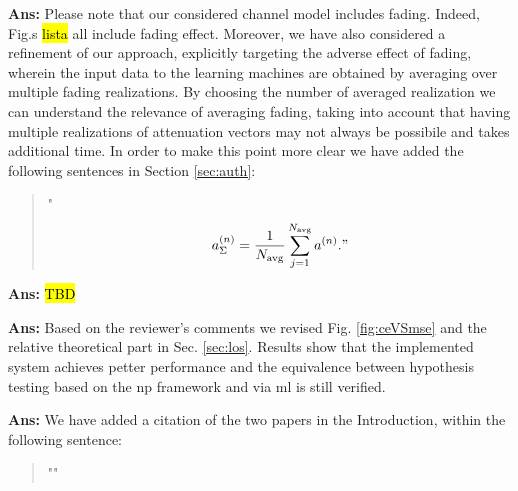 \documentclass[draftcls,onecolumn,12pt]{IEEEtran}
\newcounter{revc}
\newcommand{\revp}[1]{\zref[revcontent]{#1}}
\begin{document}
{\bf Ans:} Please note that our considered channel model includes fading. Indeed, Fig.s \hl{lista} all include fading effect. Moreover, we have also considered a refinement of our approach, explicitly targeting the adverse effect of fading, wherein the input data to the learning machines are obtained by averaging over multiple fading realizations. By choosing the number of averaged realization we can understand the relevance of averaging fading, taking into account that having multiple realizations of attenuation vectors may not always be possibile and takes additional time. In order to make this point more clear we have added the following sentences in Section \ref{sec:auth}:
\begin{quote}
    "\revp{avg_1}
$$
a^{(n)}_{\Sigma} = \frac{1}{N_{\rm avg}}\sum_{j=1}^{N_{\rm avg}} a^{(n)}."
$$
\end{quote}


\vspace{5mm} %
\begin{framed}
\end{framed}

{\bf Ans:} \hl{TBD}

\vspace{5mm} %
\begin{framed}
\end{framed}

{\bf Ans:} Based on the reviewer's comments we revised Fig. \ref{fig:ceVSmse} and the relative theoretical part in Sec. \ref{sec:los}. Results show that the implemented system achieves petter performance and the equivalence between hypothesis testing based on the \ac{np} framework and via \ac{ml} is still verified.

\vspace{5mm} %

\vspace{5mm} %
\begin{framed}
\end{framed}

{\bf Ans:} We have added a citation of the two papers in the Introduction, within the following sentence:
\begin{quote}
    "\revp{rev3cit}"
\end{quote}
\end{document}
